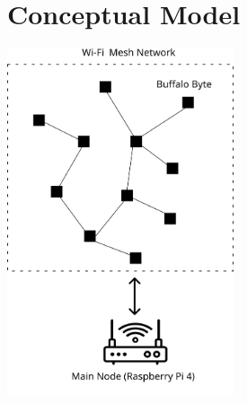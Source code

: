 \documentclass[10pt]{article}
\begin{document}
\section*{Conceptual Model}
\begin{center}
\includegraphics[width=0.5\textwidth]{conceptual-model}\\
\end{center}
\end{document}
